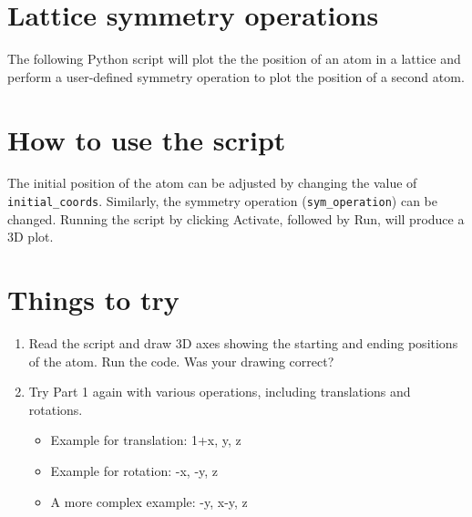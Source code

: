\documentclass{article}
\begin{document}
\section{Lattice symmetry operations}

The following Python script will plot the the position of an atom in a lattice and perform a user-defined symmetry operation to plot the position of a second atom.

\section{How to use the script}
The initial position of the atom can be adjusted by changing the value of \texttt{initial\_coords}. Similarly, the symmetry operation (\texttt{sym\_operation}) can be changed. Running the script by clicking Activate, followed by Run, will produce a 3D plot.

\section{Things to try}
\begin{enumerate}
\item Read the script and draw 3D axes showing the starting and ending positions of the atom. Run the code. Was your drawing correct?
\item Try Part 1 again with various operations, including translations and rotations.
\begin{itemize}
\item Example for translation: 1+x, y, z
\item Example for rotation: -x, -y, z
\item A more complex example: -y, x-y, z
\end{itemize}
\end{enumerate}
\end{document}
